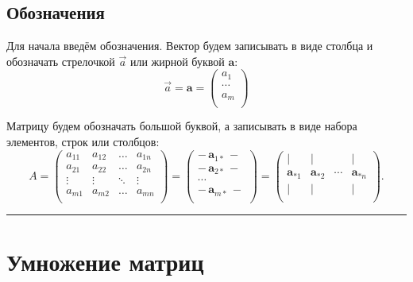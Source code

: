 \documentclass[11pt,a4paper]{article}
\begin{document}
    \hypertarget{ux43eux431ux43eux437ux43dux430ux447ux435ux43dux438ux44f}{%
\subsection{Обозначения}\label{ux43eux431ux43eux437ux43dux430ux447ux435ux43dux438ux44f}}

    Для начала введём обозначения. Вектор будем записывать в виде столбца и
обозначать стрелочкой \(\vec{a}\) или жирной буквой \(\mathbf{a}\): \[
  \vec{a} = \mathbf{a} =
  \begin{pmatrix}
     a_1    \\
     \cdots \\
     a_m    \\
  \end{pmatrix}
\]

    Матрицу будем обозначать большой буквой, а записывать в виде набора
элементов, строк или столбцов: \[
  A = 
  \begin{pmatrix}
    a_{11} & a_{12} & \ldots & a_{1n} \\
    a_{21} & a_{22} & \ldots & a_{2n} \\
    \vdots & \vdots & \ddots & \vdots \\
    a_{m1} & a_{m2} & \ldots & a_{mn} \\
  \end{pmatrix}
  =
  \begin{pmatrix}
  -\, \mathbf{a}_{1*} \,- \\
  -\, \mathbf{a}_{2*} \,- \\
  \cdots \\
  -\, \mathbf{a}_{m*} \,- \\
  \end{pmatrix}
  =
  \begin{pmatrix}
     | & | & {} & | \\
     \mathbf{a}_{*1} & \mathbf{a}_{*2} & \cdots & \mathbf{a}_{*n} \\
     | & | & {} & | \\
  \end{pmatrix}
  .
\]

    \begin{center}\rule{0.5\linewidth}{0.5pt}\end{center}

    \hypertarget{ux443ux43cux43dux43eux436ux435ux43dux438ux435-ux43cux430ux442ux440ux438ux446}{%
\section{Умножение
матриц}\label{ux443ux43cux43dux43eux436ux435ux43dux438ux435-ux43cux430ux442ux440ux438ux446}}
\end{document}
